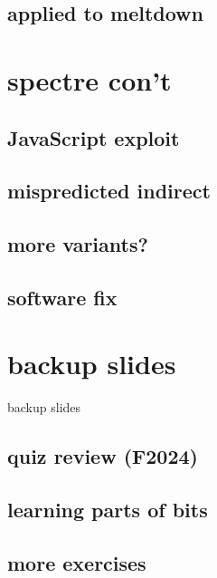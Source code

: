 \subsection{applied to meltdown}


\section{spectre con't}

\subsection{JavaScript exploit}


\subsection{mispredicted indirect}


\subsection{more variants?}


\subsection{software fix}


\section{backup slides}
\begin{frame}{backup slides}
\end{frame}

\subsection{quiz review (F2024)}


\subsection{learning parts of bits}


\subsection{more exercises}



